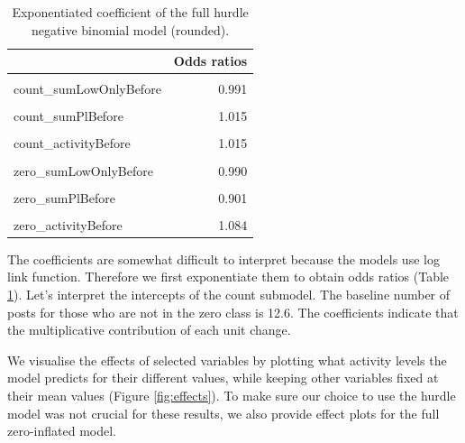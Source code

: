 \documentclass[a4paper,fleqn]{cas-dc}
\begin{document}
\begin{table}
\centering\begingroup\fontsize{9}{11}\selectfont
\begin{tabular}{lr}
\toprule
  & Odds ratios\\
\midrule
\cellcolor{gray!6}{count\_(Intercept)} & \cellcolor{gray!6}{12.606}\\
count\_sumLowOnlyBefore & 0.991\\
\cellcolor{gray!6}{count\_sumHighBefore} & \cellcolor{gray!6}{0.992}\\
count\_sumPlBefore & 1.015\\
\cellcolor{gray!6}{count\_sumPhBefore} & \cellcolor{gray!6}{0.870}\\
\addlinespace
count\_activityBefore & 1.015\\
\cellcolor{gray!6}{zero\_(Intercept)} & \cellcolor{gray!6}{1.634}\\
zero\_sumLowOnlyBefore & 0.990\\
\cellcolor{gray!6}{zero\_sumHighBefore} & \cellcolor{gray!6}{0.894}\\
zero\_sumPlBefore & 0.901\\
\addlinespace
\cellcolor{gray!6}{zero\_sumPhBefore} & \cellcolor{gray!6}{1.156}\\
zero\_activityBefore & 1.084\\
\bottomrule
\end{tabular}
\endgroup{}
\caption{Exponentiated coefficient of the full hurdle negative binomial model (rounded).}
\label{tab:exphnb}
\end{table}



The coefficients are somewhat difficult to interpret because the models
use log link function. Therefore we first exponentiate them to obtain
odds ratios (Table \ref{tab:exphnb}). Let's interpret the intercepts of
the count submodel. The baseline number of posts for those who are not
in the zero class is 12.6. The coefficients indicate that the
multiplicative contribution of each unit change.

We visualise the effects of selected variables by plotting what activity
levels the model predicts for their different values, while keeping
other variables fixed at their mean values (Figure \ref{fig:effects}). 
To make sure our choice to use the hurdle model was not crucial for
these results, we also provide effect plots for the full zero-inflated
model.
\end{document}
